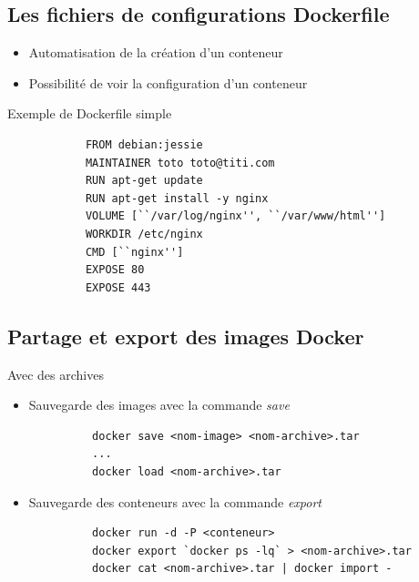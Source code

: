\documentclass{beamer}
\begin{document}
    \subsection{Les fichiers de configurations Dockerfile}
    \begin{frame}[containsverbatim]
       \begin{itemize}
          \item{Automatisation de la création d'un conteneur}
	  \item{Possibilité de voir la configuration d'un conteneur}
       \end{itemize}

       \begin{block}{Exemple de Dockerfile simple}
         \begin{verbatim}
            FROM debian:jessie
            MAINTAINER toto toto@titi.com
            RUN apt-get update
            RUN apt-get install -y nginx
            VOLUME [``/var/log/nginx'', ``/var/www/html'']
            WORKDIR /etc/nginx
            CMD [``nginx'']
            EXPOSE 80
            EXPOSE 443
         \end{verbatim}
       \end{block}
    \end{frame}

    \subsection{Partage et export des images Docker}
    \begin{frame}[containsverbatim]{Avec des archives}
       \begin{itemize}
          \item{Sauvegarde des images avec la commande \em{save}}
       \end{itemize}
       
       \begin{block}{}
          \begin{verbatim}
             docker save <nom-image> <nom-archive>.tar
             ...
             docker load <nom-archive>.tar
          \end{verbatim}
       \end{block}

       \begin{itemize}
          \item{Sauvegarde des conteneurs avec la commande \em{export}}
       \end{itemize}

       \begin{block}{}
          \begin{verbatim}
             docker run -d -P <conteneur>
             docker export `docker ps -lq` > <nom-archive>.tar
             docker cat <nom-archive>.tar | docker import -
          \end{verbatim}
       \end{block}
    \end{frame}
\end{document}
